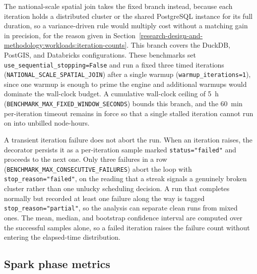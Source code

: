 The national-scale spatial join takes the fixed branch instead, because each iteration holds a distributed cluster or the shared PostgreSQL instance for its full duration, so a variance-driven rule would multiply cost without a matching gain in precision, for the reason given in Section~\ref{research-design-and-methodology:workloads:iteration-counts}. This branch covers the DuckDB, PostGIS, and Databricks configurations. These benchmarks set \texttt{use\_sequential\_stopping=False} and run a fixed three timed iterations (\texttt{NATIONAL\_SCALE\_SPATIAL\_JOIN}) after a single warmup (\texttt{warmup\_iterations=1}), since one warmup is enough to prime the engine and additional warmups would dominate the wall-clock budget. A cumulative wall-clock ceiling of \SI{5}{\hour} (\texttt{BENCHMARK\_MAX\_FIXED\_WINDOW\_SECONDS}) bounds this branch, and the \SI{60}{\minute} per-iteration timeout remains in force so that a single stalled iteration cannot run on into unbilled node-hours.

A transient iteration failure does not abort the run. When an iteration raises, the decorator persists it as a per-iteration sample marked \texttt{status="failed"} and proceeds to the next one. Only three failures in a row (\texttt{BENCHMARK\_MAX\_CONSECUTIVE\_FAILURES}) abort the loop with \texttt{stop\_reason="failed"}, on the reading that a streak signals a genuinely broken cluster rather than one unlucky scheduling decision. A run that completes normally but recorded at least one failure along the way is tagged \texttt{stop\_reason="partial"}, so the analysis can separate clean runs from mixed ones. The mean, median, and bootstrap confidence interval are computed over the successful samples alone, so a failed iteration raises the failure count without entering the elapsed-time distribution.

\subsection{Spark phase metrics}
\label{system-architecture-and-implementation:measurement-instrumentation-and-cost-model:spark-phase-metrics}

